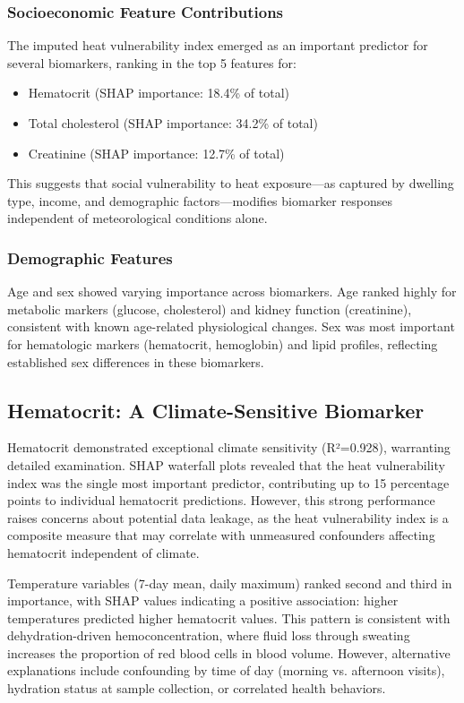 \subsubsection{Socioeconomic Feature Contributions}

The imputed heat vulnerability index emerged as an important predictor for several biomarkers, ranking in the top 5 features for:
\begin{itemize}
    \item Hematocrit (SHAP importance: 18.4\% of total)
    \item Total cholesterol (SHAP importance: 34.2\% of total)
    \item Creatinine (SHAP importance: 12.7\% of total)
\end{itemize}

This suggests that social vulnerability to heat exposure---as captured by dwelling type, income, and demographic factors---modifies biomarker responses independent of meteorological conditions alone.

\subsubsection{Demographic Features}

Age and sex showed varying importance across biomarkers. Age ranked highly for metabolic markers (glucose, cholesterol) and kidney function (creatinine), consistent with known age-related physiological changes. Sex was most important for hematologic markers (hematocrit, hemoglobin) and lipid profiles, reflecting established sex differences in these biomarkers.

\subsection{Hematocrit: A Climate-Sensitive Biomarker}

Hematocrit demonstrated exceptional climate sensitivity (R²=0.928), warranting detailed examination. SHAP waterfall plots revealed that the heat vulnerability index was the single most important predictor, contributing up to 15 percentage points to individual hematocrit predictions. However, this strong performance raises concerns about potential data leakage, as the heat vulnerability index is a composite measure that may correlate with unmeasured confounders affecting hematocrit independent of climate.

Temperature variables (7-day mean, daily maximum) ranked second and third in importance, with SHAP values indicating a positive association: higher temperatures predicted higher hematocrit values. This pattern is consistent with dehydration-driven hemoconcentration, where fluid loss through sweating increases the proportion of red blood cells in blood volume. However, alternative explanations include confounding by time of day (morning vs. afternoon visits), hydration status at sample collection, or correlated health behaviors.

